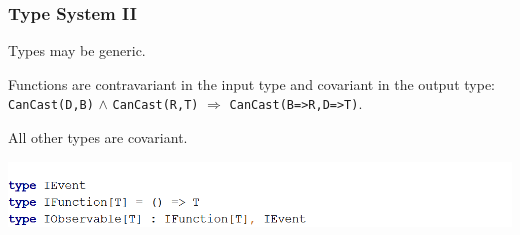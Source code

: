 \documentclass{beamer}
\begin{document}
\begin{frame}
\frametitle{Type System II}
Types may be generic. 

Functions are contravariant in the input type and covariant in the output type: \texttt{CanCast(D,B)} $\wedge$ \texttt{CanCast(R,T)} $\Rightarrow$ \texttt{CanCast(B=>R,D=>T)}.

All other types are covariant.

\includegraphics[width=1\linewidth]{iobservable.png}

\end{frame}
\end{document}
